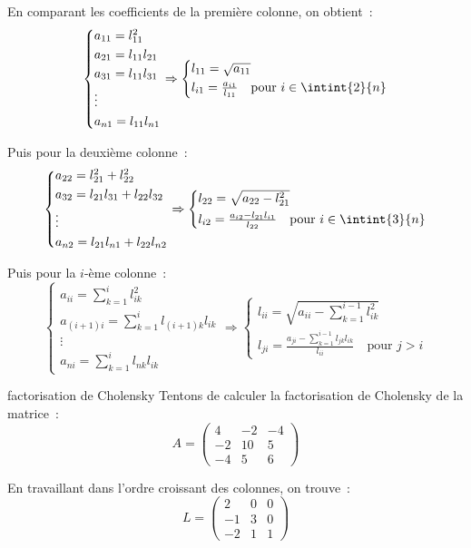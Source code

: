 En comparant les coefficients de la première colonne, on obtient~:
$$\begin{cases*}
    a_{11} = l_{11}^2\\
    a_{21} = l_{11}l_{21}\\
    a_{31} = l_{11}l_{31}\\
    \vdots\\
    a_{n1} = l_{11}l_{n1}
\end{cases*} \Rightarrow \begin{cases*}
    l_{11} = \sqrt{a_{11}}\\
    l_{i1} = \frac{a_{i1}}{l_{11}} \quad \text{pour } i \in \intint{2}{n}
\end{cases*}$$

Puis pour la deuxième colonne~:
$$\begin{cases*}
    a_{22} = l_{21}^2 + l_{22}^2\\
    a_{32} = l_{21}l_{31} + l_{22}l_{32}\\
    \vdots\\
    a_{n2} = l_{21}l_{n1} + l_{22}l_{n2}
\end{cases*} \Rightarrow \begin{cases*}
    l_{22} = \sqrt{a_{22} - l_{21}^2}\\
    l_{i2} = \frac{a_{i2} - l_{21}l_{i1}}{l_{22}} \quad \text{pour } i \in \intint{3}{n}
\end{cases*}$$

Puis pour la $i$-ème colonne~:
$$\begin{cases*}
    a_{ii} = \sum_{k=1}^i l_{ik}^2\\
    a_{(i+1)i} = \sum_{k=1}^i l_{(i+1)k}l_{ik}\\
    \vdots\\
    a_{ni} = \sum_{k=1}^i l_{nk}l_{ik}
\end{cases*} \Rightarrow \begin{cases*}
    l_{ii} = \sqrt{a_{ii} - \sum_{k=1}^{i-1} l_{ik}^2}\\
    l_{ji} = \frac{a_{ji} - \sum_{k=1}^{i-1} l_{jk}l_{ik}}{l_{ii}} \quad \text{pour } j > i
\end{cases*}$$


\begin{exemple}{}{factorisation de Cholensky}
    Tentons de calculer la factorisation de Cholensky de la matrice~:
    $$A = \begin{pmatrix}
        4 & -2 & -4 \\
        -2 & 10 & 5 \\
        -4 & 5 & 6
    \end{pmatrix}$$

    En travaillant dans l'ordre croissant des colonnes, on trouve~:
    $$L = \begin{pmatrix}
        2 & 0 & 0\\
        -1 & 3 & 0\\
        -2 & 1 & 1
    \end{pmatrix}$$
\end{exemple}
